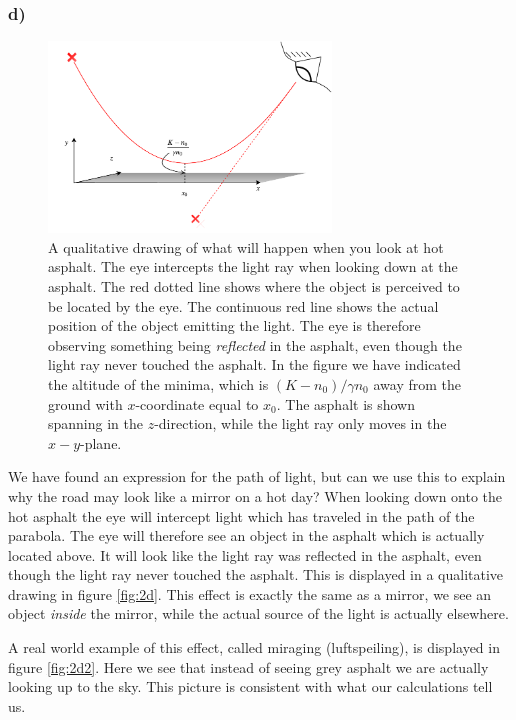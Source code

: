 \documentclass[12pt,twoside]{article}
\begin{document}
\subsubsection*{d)}
\begin{figure}
  \centering
  \includegraphics[width=0.67\textwidth]{../figures/drawing.pdf}
  \caption{A qualitative drawing of what will happen when you look at hot asphalt. The eye intercepts the light ray when looking down at the asphalt. The red dotted line shows where the object is perceived to be located by the eye. The continuous red line shows the actual position of the object emitting the light. The eye is therefore observing something being \textit{reflected} in the asphalt, even though the light ray never touched the asphalt. In the figure we have indicated the altitude of the minima, which is $(K-n_0)/\gamma n_0$ away from the ground with $x$-coordinate equal to $x_0$. The asphalt is shown spanning in the $z$-direction, while the light ray only moves in the $x-y$-plane.}
  \label{fig:2d}
\end{figure}
We have found an expression for the path of light, but can we use this to explain why the road may look like a mirror on a hot day? When looking down onto the hot asphalt the eye will intercept light which has traveled in the path of the parabola. The eye will therefore see an object in the asphalt which is actually located above. It will look like the light ray was reflected in the asphalt, even though the light ray never touched the asphalt. This is displayed in a qualitative drawing in figure \vref{fig:2d}. This effect is exactly the same as a mirror, we see an object \textit{inside} the mirror, while the actual source of the light is actually elsewhere.\par
A real world example of this effect, called miraging (luftspeiling), is displayed in figure \vref{fig:2d2}. Here we see that instead of seeing grey asphalt we are actually looking up to the sky. This picture is consistent with what our calculations tell us.
\end{document}

